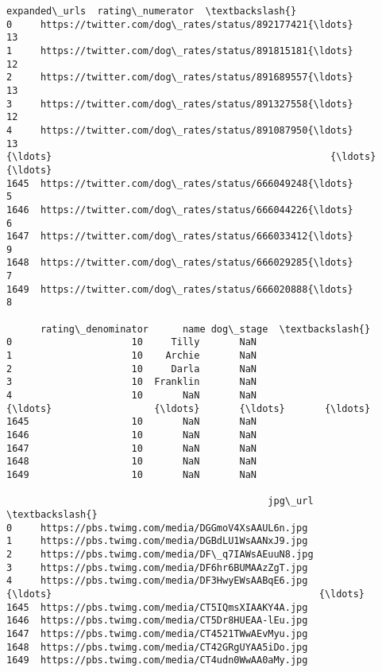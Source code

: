 \documentclass[11pt]{article}
\begin{document}
\begin{tcolorbox}[breakable, size=fbox, boxrule=.5pt, pad at break*=1mm, opacityfill=0]
\begin{Verbatim}[commandchars=\\\{\}]
                                          expanded\_urls  rating\_numerator  \textbackslash{}
0     https://twitter.com/dog\_rates/status/892177421{\ldots}                13
1     https://twitter.com/dog\_rates/status/891815181{\ldots}                12
2     https://twitter.com/dog\_rates/status/891689557{\ldots}                13
3     https://twitter.com/dog\_rates/status/891327558{\ldots}                12
4     https://twitter.com/dog\_rates/status/891087950{\ldots}                13
{\ldots}                                                 {\ldots}               {\ldots}
1645  https://twitter.com/dog\_rates/status/666049248{\ldots}                 5
1646  https://twitter.com/dog\_rates/status/666044226{\ldots}                 6
1647  https://twitter.com/dog\_rates/status/666033412{\ldots}                 9
1648  https://twitter.com/dog\_rates/status/666029285{\ldots}                 7
1649  https://twitter.com/dog\_rates/status/666020888{\ldots}                 8

      rating\_denominator      name dog\_stage  \textbackslash{}
0                     10     Tilly       NaN
1                     10    Archie       NaN
2                     10     Darla       NaN
3                     10  Franklin       NaN
4                     10       NaN       NaN
{\ldots}                  {\ldots}       {\ldots}       {\ldots}
1645                  10       NaN       NaN
1646                  10       NaN       NaN
1647                  10       NaN       NaN
1648                  10       NaN       NaN
1649                  10       NaN       NaN

                                              jpg\_url  \textbackslash{}
0     https://pbs.twimg.com/media/DGGmoV4XsAAUL6n.jpg
1     https://pbs.twimg.com/media/DGBdLU1WsAANxJ9.jpg
2     https://pbs.twimg.com/media/DF\_q7IAWsAEuuN8.jpg
3     https://pbs.twimg.com/media/DF6hr6BUMAAzZgT.jpg
4     https://pbs.twimg.com/media/DF3HwyEWsAABqE6.jpg
{\ldots}                                               {\ldots}
1645  https://pbs.twimg.com/media/CT5IQmsXIAAKY4A.jpg
1646  https://pbs.twimg.com/media/CT5Dr8HUEAA-lEu.jpg
1647  https://pbs.twimg.com/media/CT4521TWwAEvMyu.jpg
1648  https://pbs.twimg.com/media/CT42GRgUYAA5iDo.jpg
1649  https://pbs.twimg.com/media/CT4udn0WwAA0aMy.jpg


\end{Verbatim}
\end{tcolorbox}
\end{document}
